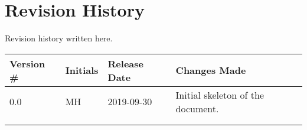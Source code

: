 \thispagestyle{empty}
\section*{Revision History}

Revision history written here.

\begin{table}[H]
\begin{tabular}{llll}
\hline
Version \# & Initials & Release Date & Changes Made \\ \hline
0.0 & MH & 2019-09-30 & Initial skeleton of the document.\\
 & & & \\
 & & & \\ \hline
\end{tabular}
\end{table}
